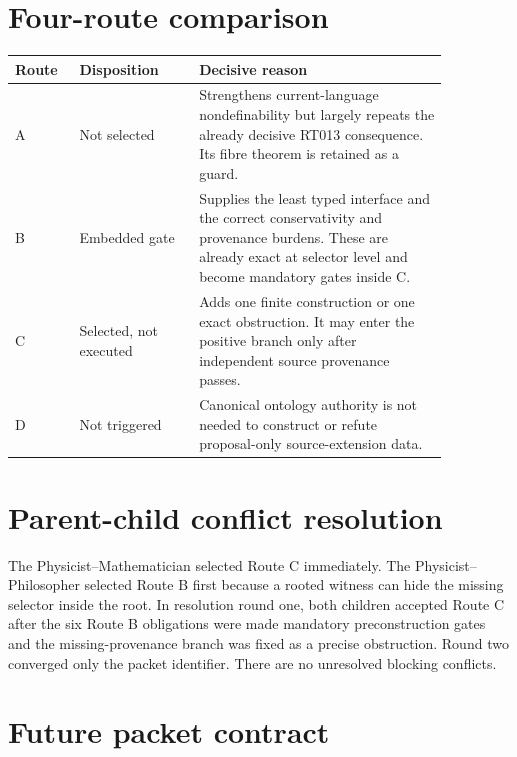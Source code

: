 \documentclass[11pt]{article}
\begin{document}
\section{Four-route comparison}

\begin{center}
\small
\begin{tabular}{>{\raggedright\arraybackslash}p{0.12\linewidth}
                >{\raggedright\arraybackslash}p{0.24\linewidth}
                >{\raggedright\arraybackslash}p{0.50\linewidth}}
\toprule
Route & Disposition & Decisive reason \\
\midrule
A & Not selected & Strengthens current-language nondefinability but largely
repeats the already decisive RT013 consequence.  Its fibre theorem is retained
as a guard. \\
B & Embedded gate & Supplies the least typed interface and the correct
conservativity and provenance burdens.  These are already exact at selector
level and become mandatory gates inside C. \\
C & Selected, not executed & Adds one finite construction or one exact
obstruction.  It may enter the positive branch only after independent source
provenance passes. \\
D & Not triggered & Canonical ontology authority is not needed to construct or
refute proposal-only source-extension data. \\
\bottomrule
\end{tabular}
\end{center}

\section{Parent-child conflict resolution}

The Physicist--Mathematician selected Route C immediately.  The
Physicist--Philosopher selected Route B first because a rooted witness can hide
the missing selector inside the root.  In resolution round one, both children
accepted Route C after the six Route B obligations were made mandatory
preconstruction gates and the missing-provenance branch was fixed as a precise
obstruction.  Round two converged only the packet identifier.  There are no
unresolved blocking conflicts.

\section{Future packet contract}
\end{document}
